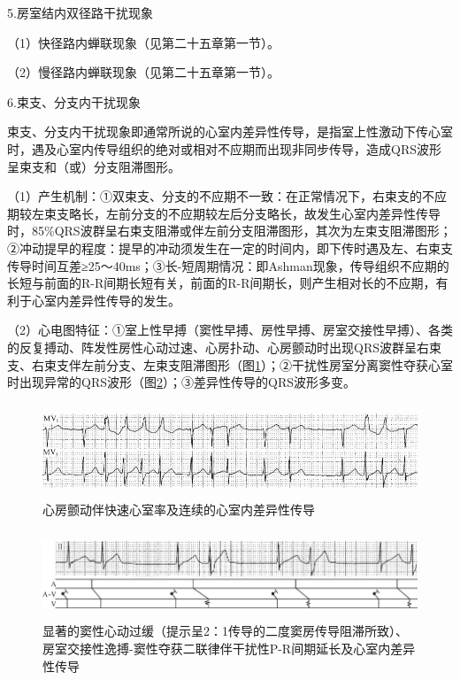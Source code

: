 5.房室结内双径路干扰现象

（1）快径路内蝉联现象（见第二十五章第一节）。

（2）慢径路内蝉联现象（见第二十五章第一节）。

6.束支、分支内干扰现象

束支、分支内干扰现象即通常所说的心室内差异性传导，是指室上性激动下传心室时，遇及心室内传导组织的绝对或相对不应期而出现非同步传导，造成QRS波形呈束支和（或）分支阻滞图形。

（1）产生机制：①双束支、分支的不应期不一致：在正常情况下，右束支的不应期较左束支略长，左前分支的不应期较左后分支略长，故发生心室内差异性传导时，85\%QRS波群呈右束支阻滞或伴左前分支阻滞图形，其次为左束支阻滞图形；②冲动提早的程度：提早的冲动须发生在一定的时间内，即下传时遇及左、右束支传导时间互差≥25～40ms；③长-短周期情况：即Ashman现象，传导组织不应期的长短与前面的R-R间期长短有关，前面的R-R间期长，则产生相对长的不应期，有利于心室内差异性传导的发生。

（2）心电图特征：①室上性早搏（窦性早搏、房性早搏、房室交接性早搏）、各类的反复搏动、阵发性房性心动过速、心房扑动、心房颤动时出现QRS波群呈右束支、右束支伴左前分支、左束支阻滞图形（图\ref{fig26-4}）；②干扰性房室分离窦性夺获心室时出现异常的QRS波形（图\ref{fig26-5}）；③差异性传导的QRS波形多变。

\begin{figure}[!htbp]
 \centering
 \includegraphics[width=5.58333in,height=1.10417in]{./images/Image00445.jpg}
 \captionsetup{justification=centering}
 \caption{心房颤动伴快速心室率及连续的心室内差异性传导}
 \label{fig26-4}
  \end{figure} 

\begin{figure}[!htbp]
 \centering
 \includegraphics[width=5.79167in,height=1.03125in]{./images/Image00446.jpg}
 \captionsetup{justification=centering}
 \caption{显著的窦性心动过缓（提示呈2：1传导的二度窦房传导阻滞所致）、房室交接性逸搏-窦性夺获二联律伴干扰性P-R间期延长及心室内差异性传导}
 \label{fig26-5}
  \end{figure} 

